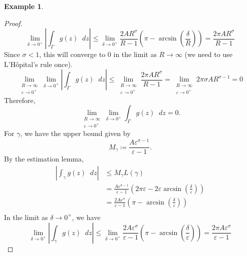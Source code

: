 \documentclass[a4paper]{article}
\newcommand*\diff{\mathop{}\!d} %
\theoremstyle{definition}
\newtheorem{example}[theorem]{Example}
\begin{document}
\begin{example}
\begin{proof}
\begin{equation*}
            \lim_{\delta \to 0^+} \left\lvert \int_\Gamma g(z) \diff z \right\rvert \leq \lim_{\delta \to 0^+} \frac{2A R^\sigma}{R - 1} \left(\pi - \arcsin \left( \frac{\delta}{R}\right) \right)  = \frac{2 \pi A R^\sigma}{R-1}
        \end{equation*}
        Since $\sigma < 1$, this will converge to $0$ in the limit as $R \to \infty$ (we need to use L'H\^opital's rule once).
        \begin{equation*}
            \lim_{\substack{R \to \infty \\ \varepsilon \to 0^+}} \lim_{\delta \to 0^+} \left\lvert \int_\Gamma g(z) \diff z \right\rvert \leq \lim_{\substack{R \to \infty \\ \varepsilon \to 0^+}} \frac{2 \pi A R^\sigma}{R-1} = \lim_{\substack{R \to \infty \\ \varepsilon \to 0^+}} 2 \pi \sigma A R^{\sigma-1} = 0
        \end{equation*}
        Therefore,
        \begin{equation*}
            \lim_{\substack{R \to \infty \\ \varepsilon \to 0^+}} \lim_{\delta \to 0^+} \int_\Gamma g(z) \diff z = 0.
        \end{equation*}
        For $\gamma$, we have the upper bound given by
        \begin{equation*}
            M_\gamma \coloneq \frac{A \varepsilon^{\sigma-1}}{\varepsilon- 1}.
        \end{equation*}
        By the estimation lemma,
        \begin{align*}
            \left\lvert \int_\gamma g(z) \diff z \right\rvert & \leq M_\gamma L(\gamma)                                                                                                                            \\
                                                              & = \frac{A \varepsilon^{\sigma-1}}{\varepsilon- 1} \left( 2\pi \varepsilon - 2 \varepsilon \arcsin \left( \frac{\delta}{\varepsilon}\right) \right) \\
                                                              & = \frac{2A \varepsilon^\sigma}{\varepsilon - 1} \left(\pi - \arcsin \left( \frac{\delta}{\varepsilon}\right) \right)                               \\
        \end{align*}
        In the limit as $\delta \to 0^+$, we have
        \begin{equation*}
            \lim_{\delta \to 0^+} \left\lvert \int_\gamma g(z) \diff z \right\rvert \leq \lim_{\delta \to 0^+} \frac{2A \varepsilon^\sigma}{\varepsilon - 1} \left(\pi - \arcsin \left( \frac{\delta}{\varepsilon}\right) \right)  = \frac{2 \pi A \varepsilon^\sigma}{\varepsilon-1}

\end{equation*}
\end{proof}
\end{example}
\end{document}
